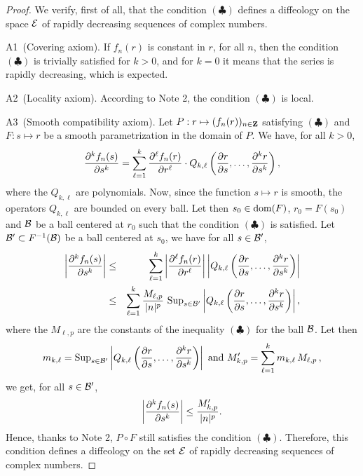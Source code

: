 \begin{proof}
  We verify, first of all, that the condition $(\clubsuit)$ defines a diffeology on the space $\mathcal{E}$ of
  rapidly decreasing sequences of complex numbers.
  
  {A1~(Covering axiom).} If $f_n(r)$ is constant in $r$, for all $n$,
  then the condition $(\clubsuit)$ is trivially satisfied for $k>0$, and for $k=0$ it means that
  the series is rapidly decreasing, which is expected.
  
  {A2~(Locality axiom).} According to Note 2, the condition $(\clubsuit)$ is local.
  
  {A3~(Smooth compatibility axiom).} Let $P : r \mapsto (f_n(r))_{n\in\mathbf{Z}}$
  satisfying $(\clubsuit)$ and $F : s \mapsto r$
  be a smooth parametrization in the domain of $P$.
  We have, for all $k>0$,
  $$
    {\partial^k f_n(s) \over \partial s^k} = \sum_{\ell = 1}^{k}
    {\partial^\ell f_n(r) \over \partial r^\ell} \cdot
    Q_{k,\ell}\left({\partial r \over \partial s},\ldots,{\partial^k r \over \partial s^k}\right),
    $$
  where the $Q_{k,\ell}$ are polynomials. Now, since the function $s\mapsto r$ is smooth,
  the operators $Q_{k,\ell}$ are bounded on every ball.
  Let then $s_0\in \mathrm{dom}(F)$, $r_0=F(s_0)$ and $\mathcal{B}$ be a ball
  centered at $r_0$ such that the condition $(\clubsuit)$ is satisfied. Let $\mathcal{B}' \subset F^{-1}(\mathcal{B})$ be a ball centered
  at $s_0$, we have for all $s \in \mathcal{B}'$,
  \begin{eqnarray*}
    \left|{\partial^k f_n(s) \over \partial s^k}\right| & \leq & \sum_{\ell = 1}^{k}
    \left| {\partial^\ell f_n(r) \over \partial r^\ell} \right|
    \left| \vphantom{{\partial^\ell f_n(s) \over \partial s^k}}  Q_{k,\ell}\left({\partial r \over \partial s},\ldots,{\partial^k r \over \partial s^k}\right)\right|\\
    & \leq & \sum_{\ell = 1}^{k} {M_{\ell,p} \over \Modulus{n}^p} \, \Sup_{s \in \cB'} \left| Q_{k,\ell}\left({\partial r \over \partial s},\ldots,{\partial^k r \over \partial s^k}\right)\right|,
  \end{eqnarray*}
  where the $M_{\ell,p}$ are the constants of the inequality $(\clubsuit)$ for the ball $\mathcal{B}$.
  Let then
  $$
    m_{k,\ell} = \operatorname{Sup}_{s \in \mathcal{B}'} \left| Q_{k,\ell}\left({\partial r \over \partial s},\ldots,{\partial^k r \over \partial s^k}\right)\right|
    \mbox{ and } M'_{k,p} = \sum_{\ell = 1}^{k}  m_{k,\ell} \, M_{\ell,p} \, ,
    $$
  we get, for all $s\in \mathcal{B}'$,
  $$
    \left|{\partial^k f_n(s) \over \partial s^k}\right|
    \leq {M'_{k,p} \over \vert n \vert^p}.
    $$
  Hence, thanks to Note 2, $P \circ F$ still satisfies the condition $(\clubsuit)$.
  Therefore, this condition defines a diffeology on the set $\mathcal{E}$ of
  rapidly decreasing sequences of complex numbers.
  

\end{proof}
